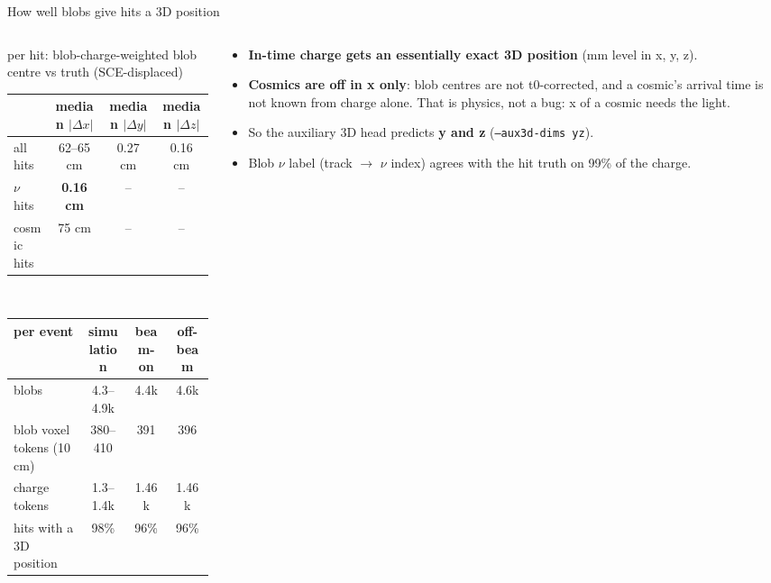 \documentclass[aspectratio=169,10pt]{beamer}
\newcommand{\code}[1]{\texttt{#1}}
\newcommand{\good}[1]{{\color{green!45!black}\textbf{#1}}}
\begin{document}
\begin{frame}{How well blobs give hits a 3D position}
  \footnotesize
  \begin{columns}[T]
    \begin{column}{0.50\textwidth}
      \centering\scriptsize
      per hit: blob-charge-weighted blob centre vs truth (SCE-displaced)\\[3pt]
      \begin{tabular}{lccc}
        \toprule
        & median $|\Delta x|$ & median $|\Delta y|$ & median $|\Delta z|$ \\
        \midrule
        all hits & 62--65 cm & 0.27 cm & 0.16 cm \\
        $\nu$ hits & \good{0.16 cm} & -- & -- \\
        cosmic hits & 75 cm & -- & -- \\
        \bottomrule
      \end{tabular}\\[8pt]
      \begin{tabular}{lccc}
        \toprule
        per event & simulation & beam-on & off-beam \\
        \midrule
        blobs & 4.3--4.9k & 4.4k & 4.6k \\
        blob voxel tokens (10\,cm) & 380--410 & 391 & 396 \\
        charge tokens & 1.3--1.4k & 1.46k & 1.46k \\
        hits with a 3D position & 98\% & 96\% & 96\% \\
        \bottomrule
      \end{tabular}
    \end{column}
    \begin{column}{0.48\textwidth}
      \begin{itemize}\setlength{\itemsep}{4pt}
        \item \textbf{In-time charge gets an essentially exact 3D position} (mm level in x, y, z).
        \item \textbf{Cosmics are off in x only}: blob centres are not t0-corrected, and a cosmic's arrival time is not known from charge alone.
          That is physics, not a bug: x of a cosmic needs the light.
        \item So the auxiliary 3D head predicts \textbf{y and z} (\code{--aux3d-dims yz}).
        \item Blob $\nu$ label (track $\to$ $\nu$ index) agrees with the hit truth on 99\% of the charge.
      \end{itemize}
    \end{column}
  \end{columns}
\end{frame}
\end{document}
